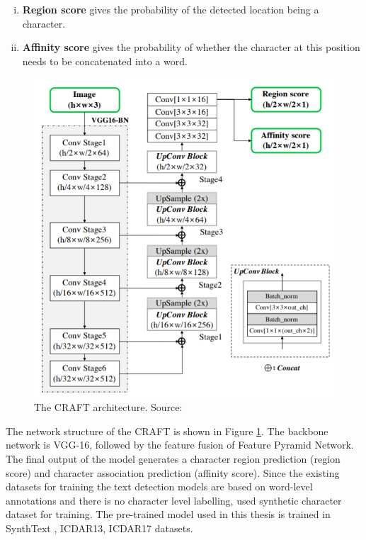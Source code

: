 \begin{enumerate}[(i)]
\item\textbf{Region score} gives the probability of the detected location being a character.
\item\textbf{Affinity score} gives the probability of whether the character at this position needs to be concatenated into a word.
\end{enumerate}


\begin{figure}[H]
\centering
\includegraphics[width=5in]{images/craftarch.png}
\caption[The CRAFT architecture]{The CRAFT architecture. Source: \citep{baek2019character}}
\label{fig:craftarch}
\end{figure} 

The network structure of the CRAFT is shown in Figure \ref{fig:craftarch}. The backbone network is VGG-16, followed by the feature fusion of Feature Pyramid Network. The final output of the model generates a character region prediction (region score) and character association prediction (affinity score). Since the existing datasets for training the text detection models are based on word-level annotations and there is no character level labelling, \citeauthor{baek2019character} used synthetic character dataset for training. The pre-trained model used in this thesis is trained in SynthText \citep{Gupta16}, ICDAR13, ICDAR17 datasets.

